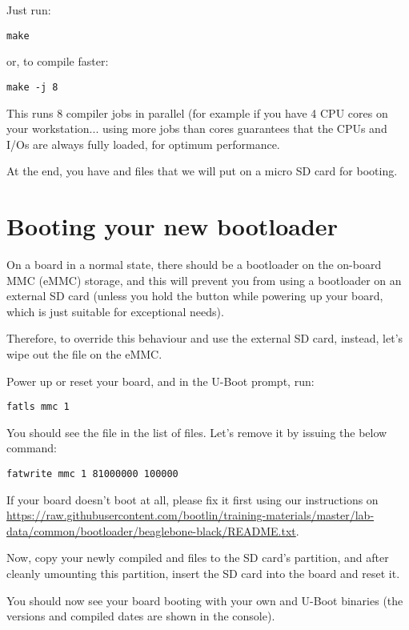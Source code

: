 Just run:
\begin{verbatim}
make
\end{verbatim}

or, to compile faster:

\begin{verbatim}
make -j 8
\end{verbatim}

This runs 8 compiler jobs in parallel (for example if you have 4 CPU
cores on your workstation... using more jobs than cores guarantees that
the CPUs and I/Os are always fully loaded, for optimum performance.

At the end, you have  and  files that we will
put on a micro SD card for booting.



\section{Booting your new bootloader}

On a board in a normal state, there should be a bootloader on the on-board MMC
(eMMC) storage, and this will prevent you from using a bootloader on an
external SD card (unless you hold the  button while powering
up your board, which is just suitable for exceptional needs).

Therefore, to override this behaviour and use the external SD card,
instead, let's wipe out the  file on the eMMC.

Power up or reset your board, and in the U-Boot prompt, run:

\begin{verbatim}
fatls mmc 1
\end{verbatim}

You should see the  file in the list of files. Let's remove it
by issuing the below command:

\begin{verbatim}
fatwrite mmc 1 81000000 100000
\end{verbatim}

If your board doesn't boot at all, please fix it first using our instructions
on
\url{https://raw.githubusercontent.com/bootlin/training-materials/master/lab-data/common/bootloader/beaglebone-black/README.txt}.

Now, copy your newly compiled  and  files to
the SD card's  partition, and after cleanly umounting this
partition, insert the SD card into the board and reset it.

You should now see your board booting with your own  and U-Boot
binaries (the versions and compiled dates are shown in the console). 
